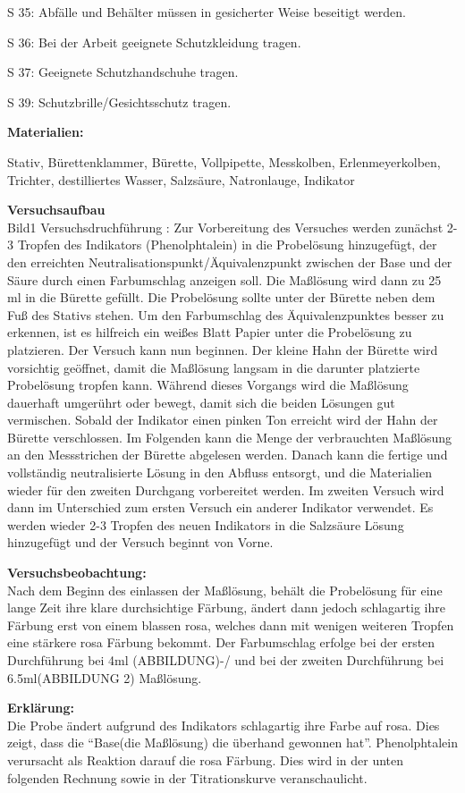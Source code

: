 \documentclass{report}
\begin{document}
S 35: Abfälle und Behälter müssen in gesicherter Weise beseitigt werden.

S 36: Bei der Arbeit geeignete Schutzkleidung tragen.

S 37: Geeignete Schutzhandschuhe tragen.

S 39: Schutzbrille/Gesichtsschutz tragen.

\vspace{20pt}
\textbf{Materialien:}

Stativ, Bürettenklammer, Bürette, Vollpipette, Messkolben, Erlenmeyerkolben,
Trichter, destilliertes Wasser, Salzsäure, Natronlauge, Indikator

\vspace{20pt}
\textbf{Versuchsaufbau}\\
Bild1
Versuchsdruchführung :
Zur Vorbereitung des Versuches werden zunächst 2-3 Tropfen des Indikators
(Phenolphtalein) in die Probelösung hinzugefügt, der den erreichten
Neutralisationspunkt/Äquivalenzpunkt zwischen der Base und der Säure durch einen
Farbumschlag anzeigen soll. Die Maßlösung wird dann zu 25 ml in die Bürette
gefüllt. Die Probelösung sollte unter der Bürette neben dem Fuß des Stativs
stehen. Um den Farbumschlag des Äquivalenzpunktes besser zu erkennen, ist es
hilfreich ein weißes Blatt Papier unter die Probelösung zu platzieren. Der
Versuch kann nun beginnen. Der kleine Hahn der Bürette wird vorsichtig geöffnet,
damit die Maßlösung langsam in die darunter platzierte Probelösung tropfen kann.
Während dieses Vorgangs wird die Maßlösung dauerhaft umgerührt oder bewegt,
damit sich die beiden Lösungen gut vermischen. Sobald der Indikator einen pinken
Ton erreicht wird der Hahn der Bürette verschlossen. Im Folgenden kann die Menge
der verbrauchten Maßlösung an den Messstrichen der Bürette abgelesen werden.
Danach kann die fertige und vollständig neutralisierte Lösung in den Abfluss
entsorgt, und die Materialien wieder für den zweiten Durchgang vorbereitet
werden. Im zweiten Versuch wird dann im Unterschied zum ersten Versuch ein
anderer Indikator verwendet. Es werden wieder 2-3 Tropfen des neuen Indikators
in die Salzsäure Lösung hinzugefügt und der Versuch beginnt von Vorne.


\vspace{20pt}
\textbf{Versuchsbeobachtung:}\\

Nach dem Beginn des einlassen der Maßlösung, behält die Probelösung für eine
lange Zeit ihre klare durchsichtige Färbung, ändert dann jedoch schlagartig ihre
Färbung erst von einem blassen rosa, welches dann mit wenigen weiteren Tropfen
eine stärkere rosa Färbung bekommt. Der Farbumschlag erfolge bei der ersten
Durchführung bei 4ml (ABBILDUNG)-/ und bei der zweiten Durchführung bei
6.5ml(ABBILDUNG 2) Maßlösung.


\vspace{20pt}
\textbf{Erkl\"arung:}\\
Die Probe ändert aufgrund des Indikators schlagartig ihre Farbe auf rosa. Dies
zeigt, dass die “Base(die Maßlösung) die überhand gewonnen hat”. Phenolphtalein
verursacht als Reaktion darauf die rosa Färbung. Dies wird in der unten
folgenden Rechnung sowie in der Titrationskurve veranschaulicht.




\end{document}
